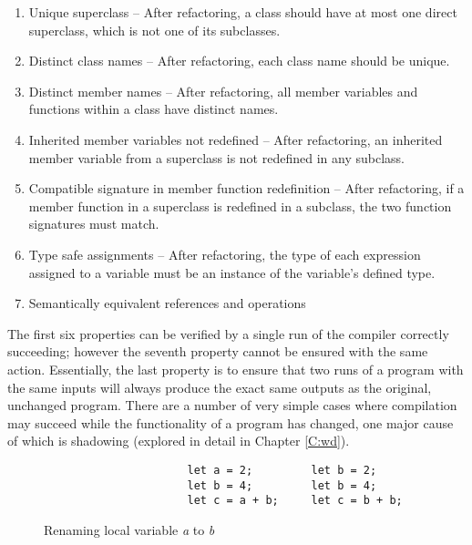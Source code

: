 \begin{enumerate}
\item Unique superclass -- After refactoring, a class should have at most one direct superclass, which is not one of its subclasses.
\item Distinct class names -- After refactoring, each class name should be unique.
\item Distinct member names --  After refactoring, all member variables and functions within a class have distinct names.
\item Inherited member variables not redefined -- After refactoring, an inherited member variable from a superclass is not redefined in any subclass.
\item Compatible signature in member function redefinition -- After refactoring, if a member function in a superclass is redefined in a subclass, the two function signatures must match.
\item Type safe assignments -- After refactoring, the type of each expression assigned to a variable must be an instance of the variable's defined type.
\item Semantically equivalent references and operations
\end{enumerate}

The first six properties can be verified by a single run of the compiler correctly succeeding; however the seventh property cannot be ensured with the same action. Essentially, the last property is to ensure that two runs of a program with the same inputs will always produce the exact same outputs as the original, unchanged program. There are a number of very simple cases where compilation may succeed while the functionality of a program has changed, one major cause of which is shadowing (explored in detail in Chapter \ref{C:wd}). 

\begin{figure}
\begin{verbatim}
                      let a = 2;         let b = 2;
                      let b = 4;         let b = 4;
                      let c = a + b;     let c = b + b;
\end{verbatim}
\caption{Renaming local variable \emph{a} to \emph{b}}
\label{Fig:opdyke}
\end{figure}

